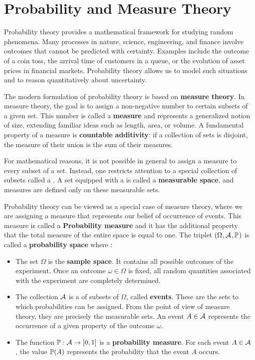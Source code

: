 \documentclass[../Main.tex]{subfiles}
\begin{document}
\chapter{Probability and Measure Theory}

Probability theory provides a mathematical framework for studying random phenomena. Many processes in nature, science, engineering, and finance involve outcomes that cannot be predicted with certainty. Examples include the outcome of a coin toss, the arrival time of customers in a queue, or the evolution of asset prices in financial markets. Probability theory allows us to model such situations and to reason quantitatively about uncertainty.

The modern formulation of probability theory is based on \textbf{measure theory}. In measure theory, the goal is to assign a non-negative number to certain subsets of a given set. This number is called a \textbf{measure} and represents a generalized notion of size, extending familiar ideas such as length, area, or volume. A fundamental property of a measure is \textbf{countable additivity}: if a collection of sets is disjoint, the measure of their union is the sum of their measures.

For mathematical reasons, it is not possible in general to assign a measure to every subset of a set. Instead, one restricts attention to a special collection of subsets called a \sfield. A set equipped with a \sfield is called a \textbf{measurable space}, and measures are defined only on these measurable sets.

Probability theory can be viewed as a special case of measure theory, where we are assigning a measure that represents our belief of occurrence of events. This measure is called a \textbf{Probability measure} and it has the additional property that the total measure of the entire space is equal to one. The triplet $(\Omega_{}, \mathcal{A}_{}, \mathbb{P}_{})$ is called a \textbf{probability space} where : 

\begin{itemize}
    \item The set $\Omega$ is the \textbf{sample space}. It contains all possible outcomes of the experiment. Once an outcome $\omega \in \Omega$ is fixed, all random quantities associated with the experiment are completely determined.
    \item The collection $\mathcal{A}$ is a \sfield of subsets of $\Omega$, called \textbf{events}. These are the sets to which probabilities can be assigned. From the point of view of measure theory, they are precisely the measurable sets. An event $A \in \mathcal{A}$ represents the occurrence of a given property of the outcome $\omega$.
    \item The function $\mathbb{P} : \mathcal{A} \to [0,1]$ is a \textbf{probability measure}. For each event $A \in \mathcal{A}$, the value $\mathbb{P}(A)$ represents the probability that the event $A$ occurs.
\end{itemize}
\end{document}

